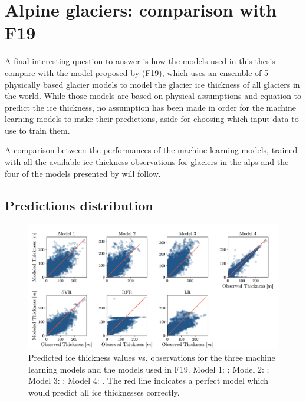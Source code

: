 \section{Alpine glaciers: comparison with F19}\label{disc-alps}

A final interesting question to answer is how the models used in this thesis compare with the model proposed by \citet{Farinotti2019} (F19), which uses an ensemble of 5 physically based glacier models to model the glacier ice thickness of all glaciers in the world. While those models are based on physical assumptions and  equation to predict the ice thickness, no assumption has been made in order for the machine learning models to make their predictions, aside for choosing which input data to use to train them. 

A comparison between the performances of the machine learning models, trained with all the available ice thickness observations for glaciers in the alps and the four of the models presented by \citet{Farinotti2019} will follow.

\subsection{Predictions distribution}\label{disc-distr} 

\begin{figure}[!tp]
	\centering		  
	\includegraphics[height=0.7\textwidth, angle=90, origin=c]{figures/physical_comp.pdf}
	\caption{Predicted ice thickness values vs. observations for the three machine learning models and the models used in F19. Model 1: \citet{Huss2012}; Model 2: \citet{Frey2014}; Model 3: \citet{OGGM2019}; Model 4: \citet{Furst2017}. The red line indicates a perfect model which would predict all ice thicknesses correctly.}
	\label{fig:thick-dist}
\end{figure}

